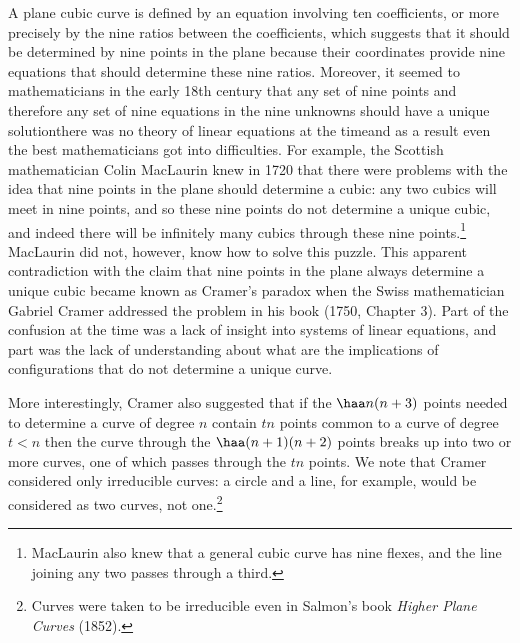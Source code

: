 A plane cubic curve is defined by an equation involving ten coefficients, or more precisely by the nine ratios between the coefficients, which suggests that it should be determined by nine points in the plane because their coordinates provide nine equations that should determine these nine ratios.  Moreover, it seemed to mathematicians in the early 18th century that any set of nine points and therefore any set of nine equations in the nine unknowns should have a unique solution\emdash there was no theory of linear equations at the time\emdash  and as a result even the best mathematicians got into difficulties. For example, the Scottish mathematician Colin MacLaurin  knew in 1720 that there were problems with the idea that nine points in the plane should determine a cubic: any two cubics will meet in nine points, and so these nine points do not determine a unique cubic, and indeed there will be infinitely many cubics through these nine points.\footnote{MacLaurin also knew that a general cubic curve has nine flexes, and the line joining any two passes through a third.}  MacLaurin did not, however, know how to solve this puzzle.  This apparent contradiction with the claim that nine points in the plane always determine a unique cubic became known as Cramer's paradox when the Swiss mathematician Gabriel Cramer addressed the problem in his book (1750, Chapter 3).  Part of the confusion at the time was a lack of insight into systems of linear equations, and part was the lack of understanding about what are the implications of configurations that do not determine a unique curve. 


\hskip-1pt 
More interestingly, Cramer also suggested that if the $\haa n(n+3)$ points needed to determine a curve of degree $n$ contain $tn$ points common to a curve of degree $t < n$ then the curve through the  $\haa (n+1)(n+2)$ points breaks up into two or more curves, one of which passes through the $tn$ points. We note that Cramer considered only irreducible curves: a circle and a line, for example, would be considered as two curves, not one.\footnote{Curves were taken to be irreducible even in Salmon's book \emph{Higher Plane Curves} (1852).} 

